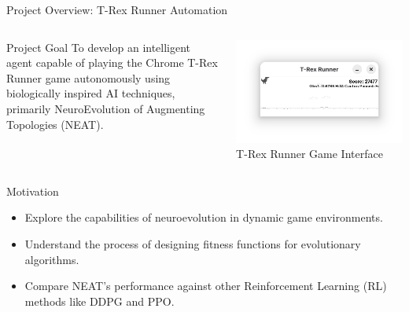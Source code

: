 \documentclass{beamer}
\begin{document}
\begin{frame}{Project Overview: T-Rex Runner Automation}
  \begin{columns}[T]
    \begin{column}{0.6\textwidth}
      \begin{block}{Project Goal}
        To develop an intelligent agent capable of playing the Chrome T-Rex Runner game autonomously using biologically inspired AI techniques, primarily NeuroEvolution of Augmenting Topologies (NEAT).
      \end{block}
    \end{column}
    \begin{column}{0.4\textwidth}
      \centering
      \includegraphics[width=\linewidth]{media/trex_game.png} %
      \tiny T-Rex Runner Game Interface
    \end{column}
  \end{columns}
  \begin{block}{Motivation}
        \begin{itemize}
          \item Explore the capabilities of neuroevolution in dynamic game environments.
          \item Understand the process of designing fitness functions for evolutionary algorithms.
          \item Compare NEAT's performance against other Reinforcement Learning (RL) methods like DDPG and PPO.
        \end{itemize}
      \end{block}
\end{frame}
\end{document}
